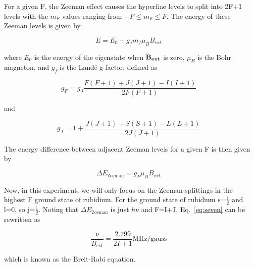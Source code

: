 \documentclass[%
 aip,
rsi,%
 amsmath,amssymb,
 reprint,%
author-numerical,%
]{revtex4-1}
\begin{document}
For a given F, the Zeeman effect causes the hyperfine levels to split into 2F+1 levels with the $m_{F}$ values ranging from $-F\leq m_{F} \leq F$. The energy of these Zeeman levels is given by 

\begin{equation}
E = E _ { 0 } + g _ { f } m _ { f } \mu _ { B } B_{ext}
\label{eq:four}
\end{equation}


\noindent where $E _ { 0 }$ is the energy of the eigenstate when $\bf{B}_{ext}$ is zero, $\mu _ { B }$ is the Bohr magneton, and $g _ { f }$ is the Land\'e g-factor, defined as 

\begin{equation}
g _ { F } = g _ { J } \frac { F ( F + 1 ) + J ( J + 1 ) - I ( I + 1 ) } { 2 F ( F + 1 ) }
\label{eq:five}
\end{equation}

\noindent and 

\begin{equation}
g _ { J } = 1 + \frac { J ( J + 1 ) + S ( S + 1 ) - L ( L + 1 ) } { 2 J ( J + 1 ) }
\label{eq:six}
\end{equation}

The energy difference between adjacent Zeeman levels for a given F is then given by 

\begin{equation}
\Delta E _ { \mathrm { Zeeman } } = g _ { F } \mu _ { B } B_{ext}
\label{eq:seven}
\end{equation}

Now, in this experiment, we will only focus on the Zeeman splittings in the highest F ground state of rubidium. For the ground state of rubidium s=$\frac{1}{2}$ and l=0, so j=$\frac{1}{2}$. Noting that $\Delta E _ { \mathrm { Zeeman } }$ is just $h\nu$ and F=I+J, Eq.~\ref{eq:seven} can be rewritten as 

\begin{equation}
\frac { \nu } { B _ { \mathrm { ext } } } = \frac { 2.799 } { 2 I + 1 } \mathrm { MHz } / \mathrm { gauss }
\label{eq:eight}
\end{equation}

\noindent which is known as the Breit-Rabi equation. 
\end{document}
